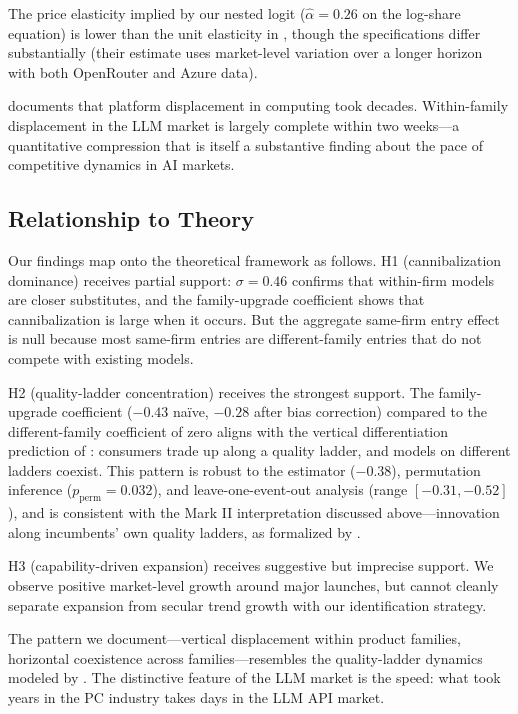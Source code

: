 \documentclass[11pt, a4paper]{article}
\begin{document}
The price elasticity implied by our nested logit ($\hat{\alpha} = 0.26$ on the log-share equation) is lower than the unit elasticity in \citet{demirer2025emerging}, though the specifications differ substantially (their estimate uses market-level variation over a longer horizon with both OpenRouter and Azure data).

\citet{bresnahan1999technological} documents that platform displacement in computing took decades. Within-family displacement in the LLM market is largely complete within two weeks---a quantitative compression that is itself a substantive finding about the pace of competitive dynamics in AI markets.

\subsection{Relationship to Theory}

Our findings map onto the theoretical framework as follows. H1 (cannibalization dominance) receives partial support: $\sigma = 0.46$ confirms that within-firm models are closer substitutes, and the family-upgrade coefficient shows that cannibalization is large when it occurs. But the aggregate same-firm entry effect is null because most same-firm entries are different-family entries that do not compete with existing models.

H2 (quality-ladder concentration) receives the strongest support. The family-upgrade coefficient ($-0.43$ na\"ive, $-0.28$ after \citealt{roth2022pretest} bias correction) compared to the different-family coefficient of zero aligns with the vertical differentiation prediction of \citet{shaked1982relaxing}: consumers trade up along a quality ladder, and models on different ladders coexist. This pattern is robust to the \citet{sunAbraham2021} estimator ($-0.38$), permutation inference ($p_{\text{perm}} = 0.032$), and leave-one-event-out analysis (range $[-0.31, -0.52]$), and is consistent with the Mark II interpretation discussed above---innovation along incumbents' own quality ladders, as formalized by \citet{aghion1992model}.

H3 (capability-driven expansion) receives suggestive but imprecise support. We observe positive market-level growth around major launches, but cannot cleanly separate expansion from secular trend growth with our identification strategy.

The pattern we document---vertical displacement within product families, horizontal coexistence across families---resembles the quality-ladder dynamics modeled by \citet{baron2020vertical}. The distinctive feature of the LLM market is the speed: what took years in the PC industry \citep{bresnahan2011schumpeterian} takes days in the LLM API market.
\end{document}
